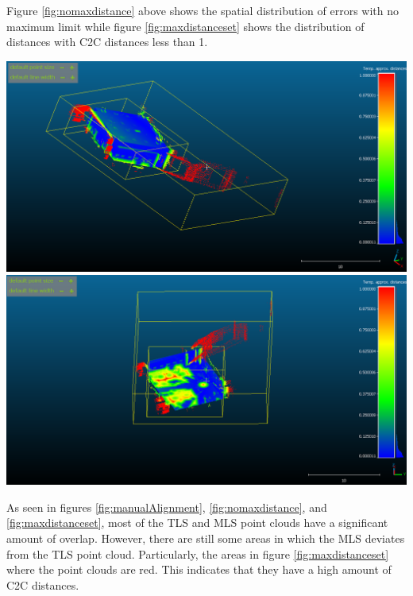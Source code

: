 \documentclass[man]{apa7}
\begin{document}
Figure \ref{fig:nomaxdistance} above shows the spatial distribution of errors with no maximum limit while figure \ref{fig:maxdistanceset} shows the distribution of distances with C2C distances less than 1.

\begin{minipage}{\linewidth}
  \includegraphics[height=\textheight/4 ,width=\textwidth/2]{figures/DistanceModel2.png}
  \includegraphics[height=\textheight/4 ,width=\textwidth/2]{figures/DistanceModel.png}
  \label{fig:maxdistanceset}
\end{minipage}

\newpage

As seen in figures \ref{fig:manualAlignment}, \ref{fig:nomaxdistance}, and \ref{fig:maxdistanceset}, most of the TLS and MLS point clouds have a significant amount of overlap. However, there are still some areas in which the MLS deviates from the TLS point cloud. Particularly, the areas in figure  \ref{fig:maxdistanceset} where the point clouds are red. This indicates that they have a high amount of C2C distances.
\end{document}
